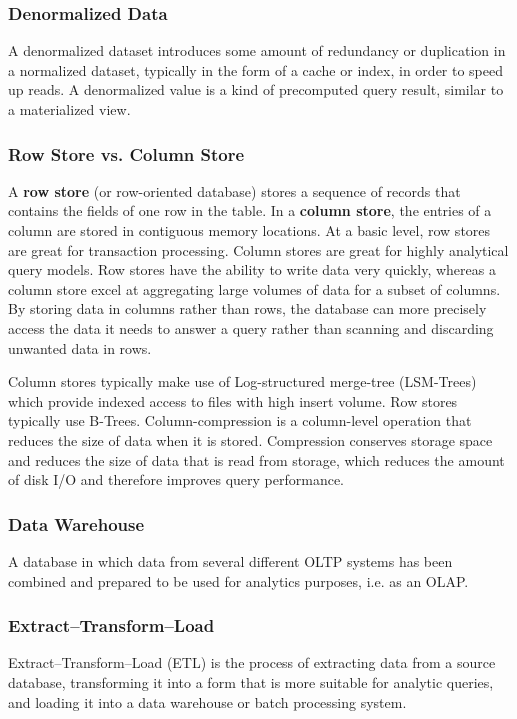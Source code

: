 \documentclass{article}
\begin{document}
    \subsubsection{Denormalized Data}
    A denormalized dataset introduces some amount of redundancy or duplication in a normalized dataset, typically in the form of a cache or index, in order to speed up reads. A  denormalized value is a kind of precomputed query result, similar to a materialized view.
    
    \subsubsection{Row Store vs. Column Store}
    A \textbf{row store} (or row-oriented database) stores a sequence of records that contains the fields of one row in the table. In a \textbf{column store}, the entries of a column are stored in contiguous memory locations. At a basic level, row stores are great for transaction processing. Column stores are great for highly analytical query models. Row stores have the ability to write data very quickly, whereas a column store excel at aggregating large volumes of data for a subset of columns. By storing data in columns rather than rows, the database can more precisely access the data it needs to answer a query rather than scanning and discarding unwanted data in rows.
    
    Column stores typically make use of Log-structured merge-tree (LSM-Trees) which provide indexed access to files with high insert volume. Row stores typically use B-Trees. Column-compression is a column-level operation that reduces the size of data when it is stored. Compression conserves storage space and reduces the size of data that is read from storage, which reduces the amount of disk I/O and therefore improves query performance.
    
    \subsubsection{Data Warehouse}
    A database in which data from several different OLTP systems has been combined and prepared to be used for analytics purposes, i.e. as an OLAP.
    
    \subsubsection{Extract–Transform–Load}
    Extract–Transform–Load (ETL) is the process of extracting data from a source database, transforming it into a form that is more suitable for analytic queries, and loading it into a data warehouse or batch processing system.
    
\end{document}
